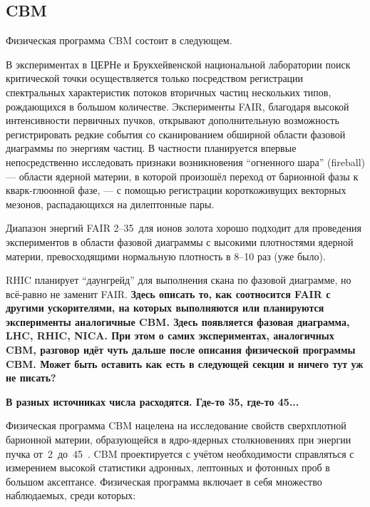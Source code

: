\subsection{CBM}

Физическая программа CBM состоит в следующем.


В экспериментах в ЦЕРНе и Брукхейвенской национальной лаборатории поиск критической точки осуществляется только посредством регистрации спектральных характеристик потоков вторичных частиц нескольких типов, рождающихся в большом количестве. Эксперименты FAIR, благодаря высокой интенсивности первичных пучков, открывают дополнительную возможность регистрировать редкие события со сканированием обширной области фазовой диаграммы по энергиям частиц. В частности планируется впервые непосредственно исследовать признаки возникновения ``огненного шара'' (fireball) --- области ядерной материи, в которой произошёл переход от барионной фазы к кварк-глюонной фазе, --- с помощью регистрации короткоживущих векторных мезонов, распадающихся на дилептонные пары.

Диапазон энергий FAIR 2--35~\GeVperNucl для ионов золота хорошо подходит для проведения экспериментов в области фазовой диаграммы с высокими плотностями ядерной материи, превосходящими нормальную плотность в 8--10 раз (уже было).


RHIC планирует ``даунгрейд'' для выполнения скана по фазовой диаграмме, но \todo всё-равно не заменит FAIR.
\todo \textbf{Здесь описать то, как соотносится FAIR с другими ускорителями, на которых выполняются или планируются эксперименты аналогичные CBM. Здесь появляется фазовая диаграмма, LHC, RHIC, NICA. При этом о самих экспериментах, аналогичных CBM, разговор идёт чуть дальше после описания физической программы CBM. Может быть оставить как есть в следующей секции и ничего тут уж не писать?}

\todo \textbf{В разных источниках числа расходятся. Где-то 35, где-то 45...}

Физическая программа CBM нацелена на исследование свойств сверхплотной барионной материи, образующейся в ядро-ядерных столкновениях при энергии пучка от~2~до~45~\GeVperNucl. CBM проектируется с учётом необходимости справляться с измерением высокой статистики адронных, лептонных и фотонных проб в большом аксептансе. Физическая программа включает в себя множество наблюдаемых, среди которых:

